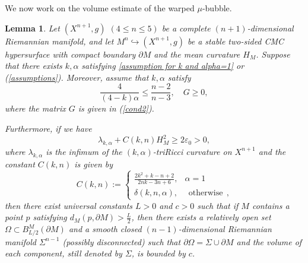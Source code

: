 \documentclass[11pt,letterpaper]{amsart}
\newtheorem{lemma}[theorem]{Lemma}
\theoremstyle{definition}
\theoremstyle{remark}
\numberwithin{equation}{section}
\begin{document}
We now work on the volume estimate of the warped $\mu$-bubble.
\begin{lemma}\label{diameterforclosedbubble}
Let $(X^{n+1},g)$ $(4\leq n\leq 5)$ be a complete $(n+1)$-dimensional Riemannian manifold, and let $M^n\hookrightarrow (X^{n+1},g)$ be a stable two-sided CMC hypersurface with compact boundary $\partial M$ and the mean curvature $H_M$.
Suppose that there exists $k,\alpha$ satisfying \eqref{assumption for k and alpha=1} or (\ref{assumptions}). Moreover, assume that $k,\alpha$ satisfy
\begin{equation}\label{assumption2}
    \frac{4}{(4-k)\alpha}\leq\frac{n-2}{n-3}, \quad G\geq 0,
\end{equation}
where the matrix $G$ is given in (\ref{cond2}).

Furthermore, if we have
\begin{equation}\label{lambda_k,alpha}
    \lambda_{k,\alpha}+C(k,n)H_M^2\geqslant 2\varepsilon_0>0,
\end{equation}
where $\lambda_{k,\alpha}$ is the infimum of the $(k,\alpha)$-triRicci curvature on $X^{n+1}$ and the constant $C(k,n)$ is given by
\begin{equation}\label{C(k,n)}
C(k,n):=\left\{\begin{array}{cc}
    \frac{2k^2+k-n+2}{2nk-3n+6}, & \alpha=1 \\
  \delta(k,n,\alpha),   & ~~\mbox{otherwise}~~,
\end{array}
\right. 
\end{equation}
then there exist universal constants $L>0$ and $c>0$ such that if $M$ contains a point $p$ satisfying $d_{M}(p,\partial M)>\frac{L}{2}$, then there exists a relatively open set $\Omega\subset B^M_{L/2}(\partial M)$ and a smooth closed $(n-1)$-dimensional Riemannian manifold $\Sigma^{n-1}$ (possibly disconnected) such that $\partial \Omega=\Sigma \cup \partial M$ and the volume of each component, still denoted by $\Sigma$, is bounded by $c$. 

\end{lemma}
\end{document}
